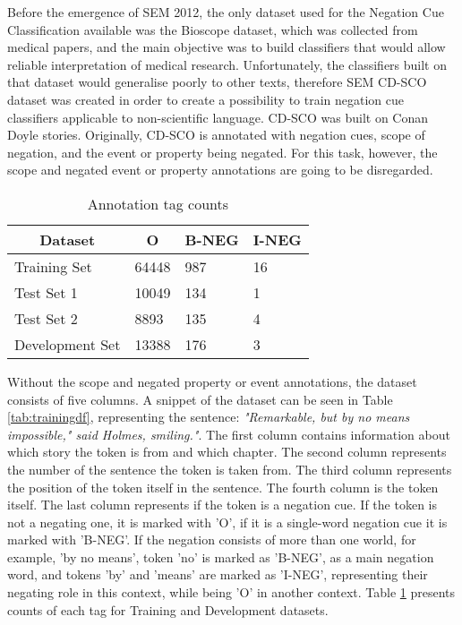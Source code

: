  
Before the emergence of SEM 2012, the only dataset used for the Negation Cue Classification available was the Bioscope dataset, which was collected from medical papers, and the main objective was to build classifiers that would allow reliable interpretation of medical research. Unfortunately, the classifiers built on that dataset would generalise poorly to other texts, therefore SEM CD-SCO dataset was created in order to create a possibility to train negation cue classifiers applicable to non-scientific language. CD-SCO was built on Conan Doyle stories. Originally, CD-SCO is annotated with negation cues, scope of negation, and the event or property being negated. For this task, however, the scope and negated event or property annotations are going to be disregarded.


\begin{table}[!h]
\centering
\caption{\label{tab:tags} Annotation tag counts}
\begin{tabular}{llll}
\hline
\multicolumn{1}{c}{\textbf{Dataset}} & \multicolumn{1}{c}{\textbf{O}} & \multicolumn{1}{c}{\textbf{B-NEG}} & \multicolumn{1}{c}{\textbf{I-NEG}}                                                                                            \\ 
\hline
Training Set & 64448 & 987 & 16\\
Test Set 1 & 10049 & 134 & 1\\
Test Set 2 & 8893 & 135 & 4\\
Development Set & 13388 & 176 & 3 \\
\hline
\end{tabular}
\end{table}



Without the scope and negated property or event annotations, the dataset consists of five columns. A snippet of the dataset can be seen in Table \ref{tab:trainingdf}, representing the sentence: \textit{"Remarkable, but by no means impossible," said Holmes, smiling."}. The first column contains information about which story the token is from and which chapter. The second column represents the number of the sentence the token is taken from. The third column represents the position of the token itself in the sentence. The fourth column is the token itself. The last column represents if the token is a negation cue. If the token is not a negating one, it is marked with 'O', if it is a single-word negation cue it is marked with 'B-NEG'. If the negation consists of more than one world, for example, 'by no means', token 'no' is marked as 'B-NEG', as a main negation word, and tokens 'by' and 'means' are marked as 'I-NEG', representing their negating role in this context, while being 'O' in another context. Table \ref{tab:tags}  presents counts of each tag for Training and Development datasets.




